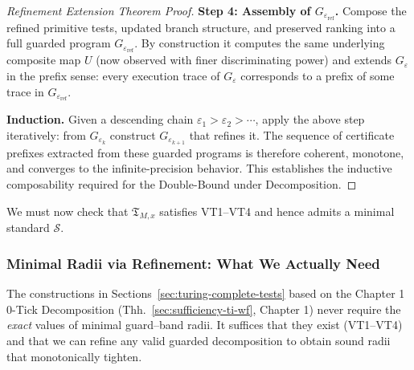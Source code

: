\documentclass[12pt]{article}
\theoremstyle{definition}
\theoremstyle{plain}
\begin{document}
\begin{proof}[Refinement Extension Theorem Proof]
\textbf{Step 4: Assembly of \(G_{\varepsilon_{\mathrm{ref}}}\).}  
Compose the refined primitive tests, updated branch structure, and preserved ranking into a full guarded program \(G_{\varepsilon_{\mathrm{ref}}}\). By construction it computes the same underlying composite map \(U\) (now observed with finer discriminating power) and extends \(G_\varepsilon\) in the prefix sense: every execution trace of \(G_\varepsilon\) corresponds to a prefix of some trace in \(G_{\varepsilon_{\mathrm{ref}}}\).

\textbf{Induction.}  
Given a descending chain \(\varepsilon_1>\varepsilon_2>\cdots\), apply the above step iteratively: from \(G_{\varepsilon_k}\) construct \(G_{\varepsilon_{k+1}}\) that refines it. The sequence of certificate prefixes extracted from these guarded programs is therefore coherent, monotone, and converges to the infinite-precision behavior. This establishes the inductive composability required for the Double-Bound under Decomposition.

\end{proof}


We must now check that \(\mathfrak T_{M,x}\) satisfies VT1–VT4 and hence admits a minimal standard \(\mathcal S\).


\subsubsection*{Minimal Radii via Refinement: What We Actually Need}

The constructions in Sections~\ref{sec:turing-complete-tests} based on the Chapter 1 0-Tick Decomposition (Thh.~\ref{sec:sufficiency-ti-wf}, Chapter 1) never require the
\emph{exact} values of minimal guard–band radii. It suffices that they exist (VT1–VT4) and that we can refine any
valid guarded decomposition to obtain sound radii that monotonically tighten. 
\end{document}
